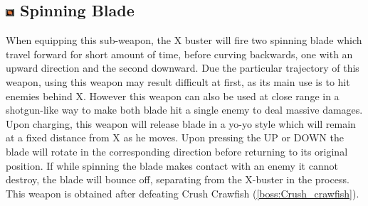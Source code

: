 \subsection{\includegraphics[width=12px, height=10px]{figures/X3/weapons/S_blade.jpg} Spinning Blade}\label{Spinning_Blade}
When equipping this sub-weapon, the X buster will fire two spinning blade which travel forward for short amount of time, before curving backwards, one with an upward direction and the second downward. Due the particular trajectory of this weapon, using this weapon may result difficult at first, as its main use is to hit enemies behind X. However this weapon can also be used at close range in a shotgun-like way to make both blade hit a single enemy to deal massive damages. 
Upon charging, this weapon will release blade in a yo-yo style which will remain at a fixed distance from X as he moves. Upon pressing the UP or DOWN the blade will rotate in the  corresponding direction before returning to its original position. If while spinning the blade makes contact with an enemy it cannot destroy, the blade will bounce off, separating from the X-buster in the process.
This weapon is obtained after defeating Crush Crawfish (\ref{boss:Crush_crawfish}).

